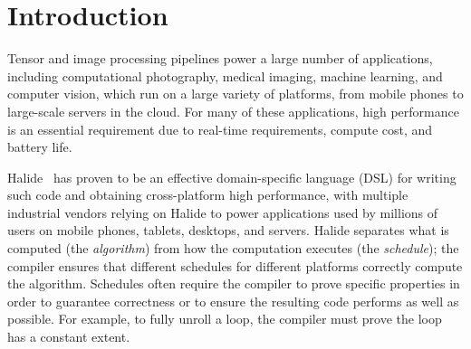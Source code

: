 \documentclass[sigplan,10pt,review,anonymous]{acmart}\settopmatter{printfolios=true,printccs=false,printacmref=false}
\begin{document}




\maketitle


\section{Introduction}
Tensor and image processing pipelines power a large number of applications,
including computational photography, medical imaging, machine learning,
and computer vision, which run on a large variety of platforms, from
mobile phones to large-scale servers in the cloud.  For many of these
applications, high performance is an essential requirement due to real-time
requirements, compute cost, and battery life.

Halide~\cite{ragankelley2012halide, ragankelley2013halide} has proven to be an effective
domain-specific language (DSL) for writing such code and obtaining cross-platform
high performance, with multiple industrial vendors relying on Halide to power
applications used by millions of users on mobile phones, tablets, desktops, and
servers.  Halide separates what is computed (the \textit{algorithm}) from how
the computation executes (the \textit{schedule}); the compiler ensures that
different schedules for different platforms correctly compute the algorithm.
Schedules often require the compiler to prove specific properties in order
to guarantee correctness or to ensure the resulting code performs as well
as possible.  For example, to fully unroll a loop, the compiler must prove
the loop has a constant extent.
\end{document}
